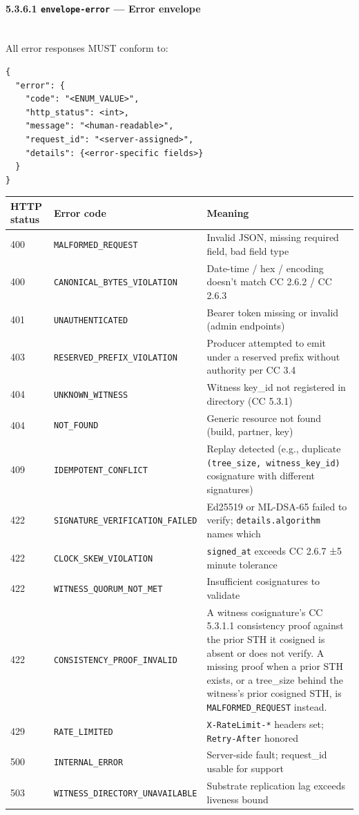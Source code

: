 \documentclass[11pt]{article}
\begin{document}
\paragraph{5.3.6.1 \texttt{envelope-error} — Error envelope}\mbox{}\\


All error responses MUST conform to:


\begin{lstlisting}
{
  "error": {
    "code": "<ENUM_VALUE>",
    "http_status": <int>,
    "message": "<human-readable>",
    "request_id": "<server-assigned>",
    "details": {<error-specific fields>}
  }
}
\end{lstlisting}

{\footnotesize
\begin{longtable}{|p{5.33cm}|p{5.33cm}|p{5.33cm}|}\hline
\textbf{HTTP status} & \textbf{Error code} & \textbf{Meaning} \\ \hline\endhead
400 & \texttt{MALFORMED\_REQUEST} & Invalid JSON, missing required field, bad field type \\ \hline
400 & \texttt{CANONICAL\_BYTES\_VIOLATION} & Date-time / hex / encoding doesn't match CC 2.6.2 / CC 2.6.3 \\ \hline
401 & \texttt{UNAUTHENTICATED} & Bearer token missing or invalid (admin endpoints) \\ \hline
403 & \texttt{RESERVED\_PREFIX\_VIOLATION} & Producer attempted to emit under a reserved prefix without authority per CC 3.4 \\ \hline
404 & \texttt{UNKNOWN\_WITNESS} & Witness key\_id not registered in directory (CC 5.3.1) \\ \hline
404 & \texttt{NOT\_FOUND} & Generic resource not found (build, partner, key) \\ \hline
409 & \texttt{IDEMPOTENT\_CONFLICT} & Replay detected (e.g., duplicate \texttt{(tree\_size, witness\_key\_id)} cosignature with different signatures) \\ \hline
422 & \texttt{SIGNATURE\_VERIFICATION\_FAILED} & Ed25519 or ML-DSA-65 failed to verify; \texttt{details.algorithm} names which \\ \hline
422 & \texttt{CLOCK\_SKEW\_VIOLATION} & \texttt{signed\_at} exceeds CC 2.6.7 ±5 minute tolerance \\ \hline
422 & \texttt{WITNESS\_QUORUM\_NOT\_MET} & Insufficient cosignatures to validate \\ \hline
422 & \texttt{CONSISTENCY\_PROOF\_INVALID} & A witness cosignature's CC 5.3.1.1 consistency proof against the prior STH it cosigned is absent or does not verify. A missing proof when a prior STH exists, or a tree\_size behind the witness's prior cosigned STH, is \texttt{MALFORMED\_REQUEST} instead. \\ \hline
429 & \texttt{RATE\_LIMITED} & \texttt{X-RateLimit-*} headers set; \texttt{Retry-After} honored \\ \hline
500 & \texttt{INTERNAL\_ERROR} & Server-side fault; request\_id usable for support \\ \hline
503 & \texttt{WITNESS\_DIRECTORY\_UNAVAILABLE} & Substrate replication lag exceeds liveness bound \\ \hline
\end{longtable}}
\end{document}
